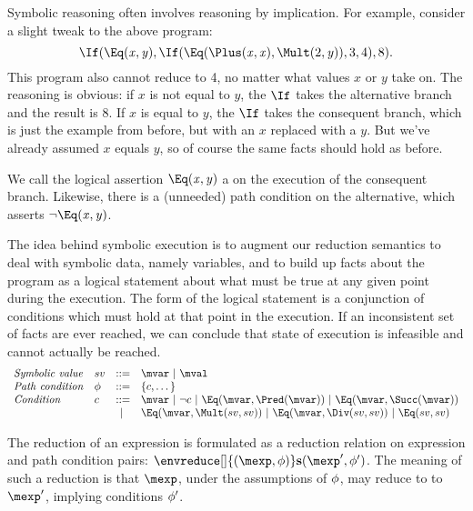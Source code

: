 Symbolic reasoning often involves reasoning by implication.  For
example, consider a slight tweak to the above program:
\[
\If(\Eq(\mathit{x},\mathit{y}),
 \If(\Eq(\Plus(\mathit{x},\mathit{x}), \Mult(2,\mathit{y})), 3, 4),
  8)\text.
\]
This program also cannot reduce to 4, no matter what values
\(\mathit{x}\) or \(\mathit{y}\) take on.  The reasoning is obvious:
if \(\mathit{x}\) is not equal to \(\mathit{y}\), the \(\If\) takes the
alternative branch and the result is 8.  If \(\mathit{x}\) is equal to
\(\mathit{y}\), the \(\If\) takes the consequent branch, which is just the
example from before, but with an \(\mathit{x}\) replaced with a
\(\mathit{y}\).  But we've already assumed \(\mathit{x}\) equals
\(\mathit{y}\), so of course the same facts should hold as before.

We call the logical assertion \(\Eq(\mathit{x}, \mathit{y})\) a
 on the execution of the consequent branch.
Likewise, there is a (unneeded) path condition on the alternative,
which asserts \(\neg\Eq(\mathit{x},\mathit{y})\).

The idea behind symbolic execution is to augment our reduction
semantics to deal with symbolic data, namely variables, and to build
up facts about the program as a logical statement about what must be
true at any given point during the execution.  The form of the logical
statement is a conjunction of conditions which must hold at that point
in the execution.  If an inconsistent set of facts are ever reached,
we can conclude that state of execution is infeasible and cannot
actually be reached.
\[
\begin{array}{llcl}
\mathit{Symbolic\ value}  & \msval & ::= & \mvar\ |\ \mval\\
\mathit{Path\ condition}  & \mpath & ::= & \{ \mcon, \dots \}\\
\mathit{Condition}        & \mcon  & ::= & \mvar\ |\ \neg\mcon\ |\ \Eq(\mvar,\Pred(\mvar))\ |\ \Eq(\mvar,\Succ(\mvar))\\
                          &        & |\  & \Eq(\mvar,\Mult(\msval,\msval))\ |\ \Eq(\mvar,\Div(\msval,\msval))\ |\ \Eq(\msval,\msval)
\end{array}
\]

The reduction of an expression is formulated as a reduction relation
on expression and path condition pairs:
$\envreduce[\relax]{(\mexp,\mpath)}\sreduce{(\mexp',\mpath')}$.  The
meaning of such a reduction is that $\mexp$, under the assumptions of 
$\phi$, may reduce to to $\mexp'$, implying conditions $\phi'$.

